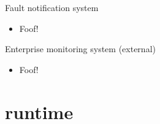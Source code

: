 \documentclass[default,pdf,colorBG,slideColor]{prosper}
\begin{document}
\begin{slide}{Fault notification system}{\small
\begin{itemize}
  \item{Foof!}
\end{itemize}
}\end{slide}
\begin{slide}{Enterprise monitoring system (external)}{\small
\begin{itemize}
  \item{Foof!}
\end{itemize}
}\end{slide}
\part{runtime}
\end{document}
